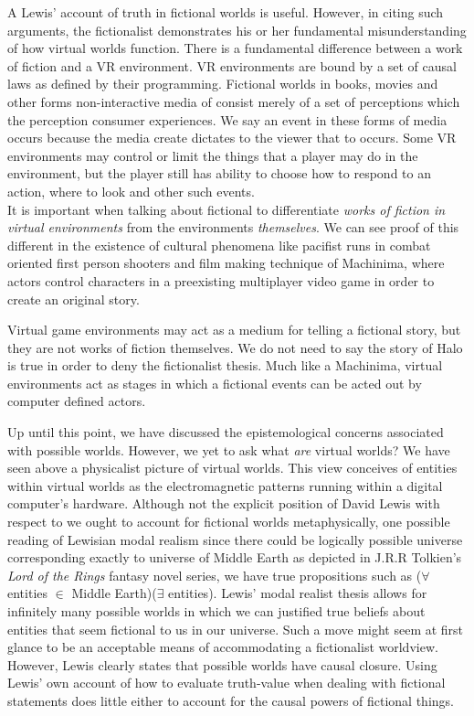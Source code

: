 A Lewis' account of truth in fictional worlds is useful. However, in citing such arguments, the fictionalist demonstrates his or her fundamental misunderstanding of how virtual worlds function. There is a fundamental difference between a work of fiction and a VR environment. VR environments are bound by a set of causal laws as defined by their programming. Fictional worlds in books, movies and other forms non-interactive media of consist merely of a set of perceptions which the perception consumer experiences. We say an event in these forms of media occurs because the media create dictates to the viewer that to occurs. Some VR environments may control or limit the things that a player may do in the environment, but the player still has ability to choose how to respond to an action, where to look and other such events. \\ It is important when talking about fictional to differentiate \textit{works of fiction in virtual environments} from the environments  \textit{themselves}. We can see proof of this different in the existence of cultural phenomena like pacifist runs in combat oriented first person shooters and film making technique of Machinima, where actors control characters in a preexisting multiplayer video game in order to create an original story.  \newline

 Virtual game environments may act as a medium for telling a fictional story, but they are not works of fiction themselves. We do not need to say the story of Halo is true in order to deny the fictionalist thesis. Much like a Machinima, virtual environments act as stages in which a fictional events can be acted out by computer defined actors. 
 
Up until this point, we have discussed the epistemological concerns associated with possible worlds. However, we yet to ask what \textit{are} virtual worlds? We have seen above a physicalist picture of virtual worlds. This view conceives of entities within virtual worlds as the electromagnetic patterns running within a digital computer's hardware. 
Although not the explicit position of David Lewis with respect to we ought to account for fictional worlds metaphysically, one possible reading of Lewisian modal realism  since there could be logically possible universe corresponding exactly to universe of Middle Earth as depicted in J.R.R Tolkien's \textit{Lord of the Rings} fantasy novel series, we have true propositions such as ($\forall $entities $\in$ Middle Earth)($\exists$ entities). Lewis' modal realist thesis allows for infinitely many possible worlds in which we can justified true beliefs about entities that seem fictional to us in our universe. Such a move might seem at first glance to be an acceptable means of 
accommodating a fictionalist worldview. However, Lewis clearly states that possible worlds have causal closure. Using Lewis' own account of how to evaluate truth-value when dealing with fictional statements does little either to account for the causal powers of fictional things.  



